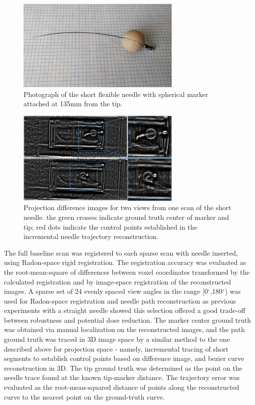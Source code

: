 \documentclass[letterpaper, 11 pt, conference]{ieeeconf} %
\begin{document}
\begin{figure}[t]
\centering
\includegraphics[width=8cm]{short_needle.jpg}
\caption{\small{Photograph of the short flexible needle with spherical marker attached at 135mm from the tip.}}
\label{short_needle_fig}
\end{figure}

\begin{figure}[b]
\centering
\includegraphics[width=8cm]{projection_diff_images.png}
\caption{\small{Projection difference images for two views from one scan of the short needle. the green crosses indicate ground truth center of marker and tip; red dots indicate the control points established in the incremental needle trajectory reconstruction.}}
\label{proj_diff_fig}
\end{figure}

The full baseline scan was registered to each sparse scan with needle inserted, using Radon-space rigid registration. The registration accuracy was evaluated as the root-mean-square of differences between voxel coordinates transformed by the calculated registration and by image-space registration of the reconstructed images. 
A sparse set of 24 evenly spaced view angles in the range [0$^\circ$,180$^\circ$) was used for Radon-space registration and needle path reconstruction as previous experiments \cite{medan2017reduced} with a straight needle showed this selection offered a good trade-off between robustness and potential dose reduction.
The marker center ground truth was obtained via manual localization on the reconstructed images, and the path ground truth was traced in 3D image space by a similar method to the one described above for projection space - namely, incremental tracing of short segments to establish control points based on difference image, and bezier curve reconstruction in 3D. The tip ground truth was determined as the point on the needle trace found at the known tip-marker distance. The trajectory error was evaluated as the root-mean-squared distance of points along the reconstructed curve to the nearest point on the ground-truth curve.
\end{document}
